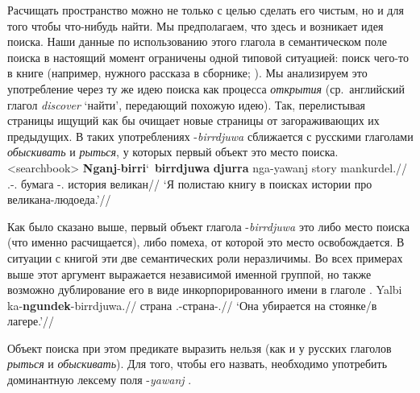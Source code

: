 Расчищать пространство можно не только с целью сделать его чистым, но и для того чтобы что-нибудь найти. Мы предполагаем, что здесь и возникает идея поиска. %
Наши данные по использованию этого глагола в семантическом поле поиска в настоящий момент ограничены одной типовой ситуацией: поиск чего-то в книге (например, нужного рассказа в сборнике; ). Мы анализируем это употребление через ту же идею поиска как процесса \textit{открытия} (ср.\ английский глагол \textit{discover} `найти', передающий похожую идею). Так, перелистывая страницы ищущий как бы очищает новые страницы от загораживающих их предыдущих. %
В таких употреблениях -\textit{birrdjuwa} сближается с русскими глаголами \textit{обыскивать} и \textit{рыться}, у которых первый объект это место поиска.
\ex<searchbook>\begingl
\gla \textbf{Nganj}-\textbf{birri}\char`~\textbf{birrdjuwa} \textbf{djurra} nga-yawanj story mankurdel.//
\glb \Fsg.\Fut-\rdp\bdj.\Np{} бумага \nga-\yaw.\Np{} история великан//
\glft `Я полистаю книгу в поисках истории про великана-людоеда.'//%
\endgl\xe

Как было сказано выше, первый объект глагола -\textit{birrdjuwa} это либо место поиска (что именно расчищается), либо помеха, от которой это место освобождается. В ситуации с книгой эти две семантических роли неразличимы. Во всех примерах выше этот аргумент выражается независимой именной группой, но также возможно дублирование его в виде инкорпорированного имени в глаголе . %
\begingl
\gla Yalbi ka-\textbf{ngundek}-birrdjuwa.//
\glb страна \Tsg.\Real-страна-\bdj.\Np{}//
\glft `Она убирается на стоянке/в лагере.'//
\endgl\xe

Объект поиска при этом предикате выразить нельзя (как и у русских глаголов \textit{рыться} и \textit{обыскивать}). Для того, чтобы его назвать, необходимо употребить доминантную лексему поля -\textit{yawanj} .

